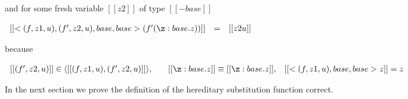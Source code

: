 \begin{example}
\begin{center}
\begin{math}
\begin{array}{lll}
      \end{array}
    \end{math}
  \end{center}
    and for some fresh variable $[[z2]]$ of type $[[{-base}]]$
    \begin{center}
    \begin{math}
      \begin{array}{lll}
        [[<(f,z1,u),(f',z2,u),base,base>(f' (\z:base.z))]]  & = & [[z2 u]]\\
      \end{array}
    \end{math}
  \end{center}
  because
  \begin{center}
    \begin{math}
      \begin{array}{llllll}
        [[(f',z2,u)]] \in \langle[[(f,z1,u),(f',z2,u)]]\rangle, &
        &
        [[\z:base.z]] \equiv [[\z:base.z]],
        &
        [[<(f,z1,u),base,base>z]] = z
      \end{array}
    \end{math}
  \end{center}
\end{example}
In the next section we prove the definition of the hereditary substitution function correct.

